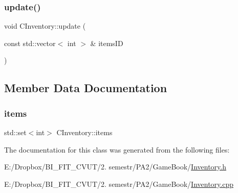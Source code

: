 \subsubsection{\texorpdfstring{update()}{update()}\hspace{0.1cm}{\footnotesize\ttfamily [2/2]}}
{\footnotesize\ttfamily void C\+Inventory\+::update (\begin{DoxyParamCaption}\item[{const std\+::vector$<$ int $>$ \&}]{items\+ID }\end{DoxyParamCaption})}



\subsection{Member Data Documentation}
\mbox{\label{class_c_inventory_a6e8d618c0236a8221a876466b53e4ddb}} 
\subsubsection{\texorpdfstring{items}{items}}
{\footnotesize\ttfamily std\+::set$<$int$>$ C\+Inventory\+::items\hspace{0.3cm}{\ttfamily [protected]}}



The documentation for this class was generated from the following files\+:\begin{DoxyCompactItemize}
\item 
E\+:/\+Dropbox/\+B\+I\+\_\+\+F\+I\+T\+\_\+\+C\+V\+U\+T/2. semestr/\+P\+A2/\+Game\+Book/\mbox{\hyperlink{_inventory_8h}{Inventory.\+h}}\item 
E\+:/\+Dropbox/\+B\+I\+\_\+\+F\+I\+T\+\_\+\+C\+V\+U\+T/2. semestr/\+P\+A2/\+Game\+Book/\mbox{\hyperlink{_inventory_8cpp}{Inventory.\+cpp}}\end{DoxyCompactItemize}
